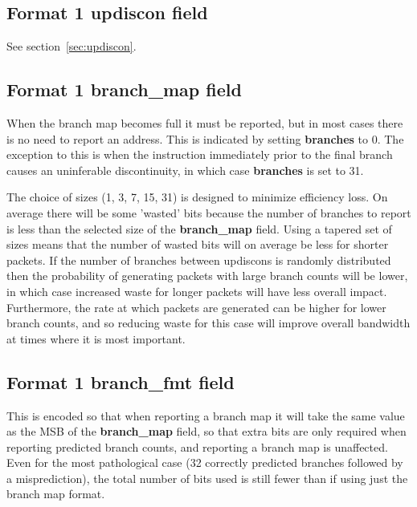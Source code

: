 \subsection{Format 1 \textbf{updiscon} field}

See section~\ref{sec:updiscon}.

\subsection{Format 1 \textbf{branch\_map} field}
When the branch map becomes full it must be reported, but in most cases there is no need to report an address.
This is indicated by setting \textbf{branches} to 0.  The exception to this is when the instruction immediately prior to 
the final branch causes an uninferable discontinuity, in which case \textbf{branches} is set to 31.

The choice of sizes (1, 3, 7, 15, 31) is designed to minimize efficiency loss.  On average there will be some 'wasted' bits 
because the number of branches to report is less than the selected size of the \textbf{branch\_map} field.
Using a tapered set of sizes means that the number of wasted bits will on average be less for shorter packets.
If the number of branches between updiscons is randomly distributed then the probability of generating packets with large
branch counts will be lower, in which case increased waste for longer packets will have less overall impact.
Furthermore, the rate at which packets are generated can be higher for lower branch counts, and so reducing
waste for this case will improve overall bandwidth at times where it is most important.

\subsection{Format 1 \textbf{branch\_fmt} field}

This is encoded so that when reporting a branch map it will take the same value as the MSB of the \textbf{branch\_map} 
field, so that extra bits are only required when reporting predicted branch counts, and reporting a branch map is unaffected.  
Even for the most pathological case (32 correctly predicted branches followed by a misprediction), the total number of bits 
used is still fewer than if using just the branch map format.

